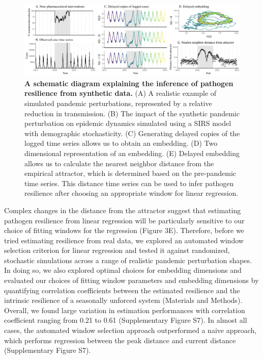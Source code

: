 \documentclass[12pt]{article}
\begin{document}
\begin{figure}[!ht]
\includegraphics[width=\textwidth]{../figure3/figure3.pdf}
\caption{
\textbf{A schematic diagram explaining the inference of pathogen resilience from synthetic data.}
(A) A realistic example of simulated pandemic perturbations, represented by a relative reduction in transmission.
(B) The impact of the synthetic pandemic perturbation on epidemic dynamics simulated using a SIRS model with demographic stochasticity.
(C) Generating delayed copies of the logged time series allows us to obtain an embedding.
(D) Two dimensional representation of an embedding.
(E) Delayed embedding allows us to calculate the nearest neighbor distance from the empirical attractor, which is determined based on the pre-pandemic time series.
This distance time series can be used to infer pathogen resilience after choosing an appropriate window for linear regression.
}
\end{figure}

Complex changes in the distance from the attractor suggest that estimating pathogen resilience from linear regression will be particularly sensitive to our choice of fitting windows for the regression (Figure 3E).
Therefore, before we tried estimating resilience from real data, we explored an automated window selection criterion for linear regression and tested it against randomized, stochastic simulations across a range of realistic pandemic perturbation shapes.
In doing so, we also explored optimal choices for embedding dimensions and evaluated our choices of fitting window parameters and embedding dimensions by quantifying correlation coefficients between the estimated resilience and the intrinsic resilience of a seasonally unforced system (Materials and Methods).
Overall, we found large variation in estimation performances with correlation coefficient ranging from 0.21 to 0.61 (Supplementary Figure S7).
In almost all cases, the automated window selection approach outperformed a naive approach, which performs regression between the peak distance and current distance (Supplementary Figure S7).
\end{document}
